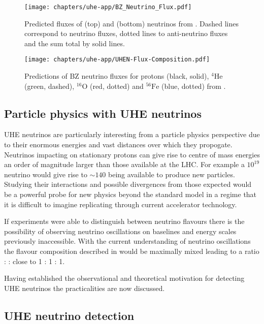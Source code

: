 \begin{figure}[htpb]
  \centering
  \texttt{[image: chapters/uhe-app/BZ\_Neutrino\_Flux.pdf]}
  \caption{Predicted fluxes of \Pnue (top) and \Pnum (bottom) neutrinos from \cite{PhysRevD.64.093010}. Dashed lines correspond to neutrino fluxes, dotted lines to anti-neutrino fluxes and the sum total by solid lines.}
  \label{fig:uhe-app:UHEN:UHEN-Flux}
\end{figure}

\begin{figure}[htpb]
  \centering
  \texttt{[image: chapters/uhe-app/UHEN-Flux-Composition.pdf]}
  \caption{Predictions of BZ neutrino fluxes for protons (black, solid), $^4\mbox{He}$ (green, dashed), $^16 \mbox{O}$ (red, dotted) and $^56\mbox{Fe}$ (blue, dotted) from \cite{Hooper200511}.}
  \label{fig:uhe-app:UHEN:UHEN-Flux-Composition-Models}
\end{figure}

\subsection{Particle physics with UHE neutrinos}
\label{sec:uhe-app:UHEN:particle-physics}

UHE neutrinos are particularly interesting from a particle physics perspective due to their enormous energies and vast distances over which they propogate. Neutrinos impacting on stationary protons can give rise to centre of mass energies an order of magnitude larger than those available at the LHC. For example a $10^{19}$ \eV neutrino would give rise to $\sim 140$ \TeV being available to produce new particles. Studying their interactions and possible divergences from those expected would be a powerful probe for new physics beyond the standard model in a regime that it is difficult to imagine replicating through current accelerator technology.

If experiments were able to distinguish between neutrino flavours there is the possibility of observing neutrino oscillations on baselines and energy scales previously inaccessible. With the current understanding of neutrino oscillations the flavour composition described in  would be maximally mixed leading to a ratio \Pnue : \Pnum : \Pnut close to 1 : 1 : 1.

Having established the observational and theoretical motivation for detecting UHE neutrinos the practicalities are now discussed.

\subsection{UHE neutrino detection}
\label{sec:uhe-app:UHEN:detection}

